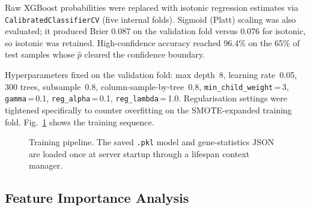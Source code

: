 \documentclass[conference]{IEEEtran}
\begin{document}
Raw XGBoost probabilities were replaced with isotonic regression
estimates via \texttt{CalibratedClassifierCV} (five internal folds).
Sigmoid (Platt) scaling was also evaluated; it produced Brier 0.087
on the validation fold versus 0.076 for isotonic, so isotonic was
retained. High-confidence accuracy reached 96.4\% on the 65\% of
test samples whose $\hat{p}$ cleared the confidence boundary.

Hyperparameters fixed on the validation fold: max depth~8, learning
rate~0.05, 300 trees, subsample~0.8, column-sample-by-tree~0.8,
\texttt{min\_child\_weight}\,=\,3, \texttt{gamma}\,=\,0.1,
\texttt{reg\_alpha}\,=\,0.1, \texttt{reg\_lambda}\,=\,1.0.
Regularisation settings were tightened specifically to counter
overfitting on the SMOTE-expanded training fold.
Fig.~\ref{fig:trainflow} shows the training sequence.

\begin{figure}[!htb]
\centering
{}
\caption{Training pipeline. The saved \texttt{.pkl} model and
         gene-statistics JSON are loaded once at server startup
         through a lifespan context manager.}
\label{fig:trainflow}
\end{figure}

\subsection{Feature Importance Analysis}
\end{document}
